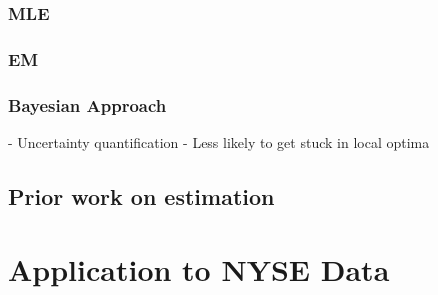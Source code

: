 \documentclass[honours,12pt]{unswthesis}
\numberwithin{equation}{section}
\begin{document}
\subsection{MLE}
\subsection{EM}
\subsection{Bayesian Approach}
- Uncertainty quantification
- Less likely to get stuck in local optima

\section{Prior work on estimation}

\chapter{Application to NYSE Data}
\end{document}
